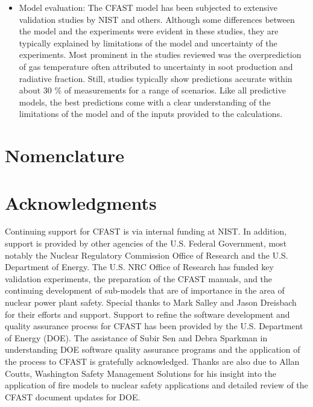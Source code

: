 \documentclass[12pt]{book}
\begin{document}
\begin{itemize}
\item Model evaluation: The CFAST model has been subjected to extensive validation studies
by NIST and others. Although some differences between the model and the experiments
were evident in these studies, they are typically explained by limitations of the model and
uncertainty of the experiments. Most prominent in the studies reviewed was the overprediction
of gas temperature often attributed to uncertainty in soot production and
radiative fraction. Still, studies typically show predictions accurate within about 30 \%
of measurements for a range of scenarios. Like all predictive models, the best predictions
come with a clear understanding of the limitations of the model and of the inputs
provided to the calculations.

\end{itemize}

\chapter{Nomenclature}


\chapter{Acknowledgments}

\label{acksection}

Continuing support for CFAST is via internal funding at NIST. In addition, support is provided by other agencies of the U.S. Federal Government, most notably the Nuclear Regulatory Commission Office of Research and the U.S. Department of Energy. The U.S. NRC Office of Research has funded key validation experiments, the preparation
of the CFAST manuals, and the continuing development of sub-models that are of importance in the area of nuclear power plant safety. Special thanks to Mark Salley and Jason Dreisbach for their efforts and support. Support to refine the software development and quality assurance process for CFAST has been provided by the U.S. Department of Energy (DOE). The assistance of Subir Sen and Debra Sparkman in understanding DOE software quality assurance programs and the application of the process to CFAST is gratefully acknowledged.  Thanks are also due to Allan Coutts, Washington Safety Management Solutions for his insight into the application of fire models to nuclear safety applications and detailed review of the CFAST document updates for DOE.


\tableofcontents

\listoffigures

\listoftables

\mainmatter








\backmatter




\appendix

\pagestyle{empty}


\end{document}
